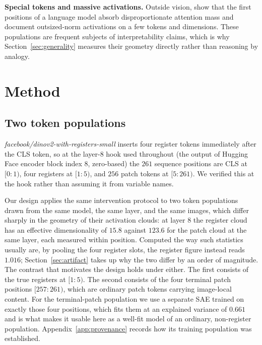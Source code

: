 \documentclass{article}
\begin{document}
\textbf{Special tokens and massive activations.} Outside vision, \citet{xiao2023efficient} show that the first positions of a language model absorb disproportionate attention mass and \citet{sun2024massive} document outsized-norm activations on a few tokens and dimensions. These populations are frequent subjects of interpretability claims, which is why Section~\ref{sec:generality} measures their geometry directly rather than reasoning by analogy.

\section{Method}
\label{sec:method}

\subsection{Two token populations}
\label{sec:populations}

\textit{facebook/dinov2-with-registers-small} inserts four register tokens immediately after the CLS token, so at the layer-8 hook used throughout (the output of Hugging Face encoder block index 8, zero-based) the $261$ sequence positions are CLS at $[0{:}1)$, four registers at $[1{:}5)$, and $256$ patch tokens at $[5{:}261)$. We verified this at the hook rather than assuming it from variable names.

Our design applies the same intervention protocol to two token populations drawn from the same model, the same layer, and the same images, which differ sharply in the geometry of their activation clouds: at layer 8 the register cloud has an effective dimensionality of $15.8$ against $123.6$ for the patch cloud at the same layer, each measured within position. Computed the way such statistics usually are, by pooling the four register slots, the register figure instead reads $1.016$; Section~\ref{sec:artifact} takes up why the two differ by an order of magnitude. The contrast that motivates the design holds under either. The first consists of the true registers at $[1{:}5)$. The second consists of the four terminal patch positions $[257{:}261)$, which are ordinary patch tokens carrying image-local content. For the terminal-patch population we use a separate SAE trained on exactly those four positions, which fits them at an explained variance of $0.661$ and is what makes it usable here as a well-fit model of an ordinary, non-register population. Appendix~\ref{app:provenance} records how its training population was established.
\end{document}
